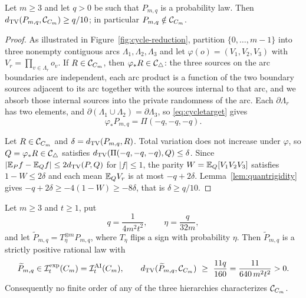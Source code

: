 \begin{lemma}\label{lem:cycledistance}
Let $m\ge3$ and let $q>0$ be such that $P_{m,q}$ is a probability law. Then $d_{\operatorname{TV}}(P_{m,q},\mathcal C_{C_m})\ge q/10$; in particular $P_{m,q}\notin\mathcal C_{C_m}$.
\end{lemma}

\begin{proof}
As illustrated in Figure~\ref{fig:cycle-reduction}, partition $\{0,\dots,m-1\}$ into three nonempty contiguous arcs $\Lambda_1,\Lambda_2,\Lambda_3$ and let $\varphi(o)=(V_1,V_2,V_3)$ with $V_r=\prod_{v\in\Lambda_r}o_v$. If $R\in\mathcal C_{C_m}$, then $\varphi_*R\in\mathcal C_{\triangle}$: the three sources on the arc boundaries are independent, each arc product is a function of the two boundary sources adjacent to its arc together with the sources internal to that arc, and we absorb those internal sources into the private randomness of the arc. Each $\partial\Lambda_r$ has two elements, and $\partial(\Lambda_1\cup\Lambda_2)=\partial\Lambda_3$, so \eqref{eq:cycletarget} gives
\[
\varphi_*P_{m,q}=\Pi(-q,-q,-q).
\]

Let $R\in\mathcal C_{C_m}$ and $\delta=d_{\operatorname{TV}}(P_{m,q},R)$. Total variation does not increase under $\varphi$, so $Q=\varphi_*R\in\mathcal C_{\triangle}$ satisfies $d_{\operatorname{TV}}(\Pi(-q,-q,-q),Q)\le\delta$. Since $|\mathbb E_Pf-\mathbb E_Qf|\le2d_{\operatorname{TV}}(P,Q)$ for $|f|\le1$, the parity $W=\mathbb E_Q[V_1V_2V_3]$ satisfies $1-W\le2\delta$ and each mean $\mathbb E_QV_r$ is at most $-q+2\delta$. Lemma~\ref{lem:quantrigidity} gives $-q+2\delta\ge-4(1-W)\ge-8\delta$, that is $\delta\ge q/10$.
\end{proof}



\begin{theorem}\label{thm:cycle}
Let $m\ge3$ and $t\ge1$, put
\[
q=\frac1{4m^2t^2},\qquad \eta=\frac q{32m},
\]
and let $\widetilde P_{m,q}=T_\eta^{\otimes m}P_{m,q}$, where $T_\eta$ flips a sign with probability $\eta$. Then $\widetilde P_{m,q}$ is a strictly positive rational law with
\[
\widetilde P_{m,q}\in\Iexp_t(C_m)=\IAI_t(C_m),\qquad
d_{\TV}(\widetilde P_{m,q},\Ccyc)\ \ge\ \frac{11q}{160}=\frac{11}{640\,m^2t^2}>0 .
\]
Consequently no finite order of any of the three hierarchies characterizes $\mathcal C_{C_m}$.
\end{theorem}

